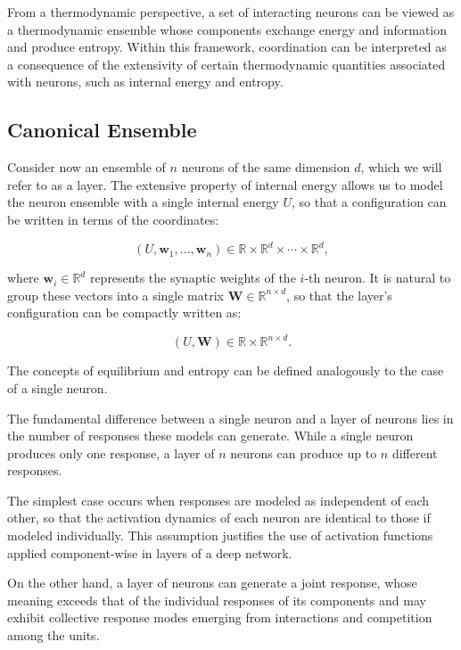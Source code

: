 \documentclass[12pt]{article}
\begin{document}
From a thermodynamic perspective, a set of interacting neurons can be viewed as a thermodynamic ensemble whose components exchange energy and information and produce entropy. Within this framework, coordination can be interpreted as a consequence of the extensivity of certain thermodynamic quantities associated with neurons, such as internal energy and entropy.
\subsection*{Canonical Ensemble}

Consider now an ensemble of $n$ neurons of the same dimension $d$, which we will refer to as a layer. The extensive property of internal energy allows us to model the neuron ensemble with a single internal energy $U$, so that a configuration can be written in terms of the coordinates:

\begin{equation}
(U, \mathbf{w}_1, \ldots, \mathbf{w}_n) \in \mathbb{R} \times \mathbb{R}^{d} \times \cdots \times \mathbb{R}^d  ,
\end{equation}

where $\mathbf{w}_i \in \mathbb{R}^d$ represents the synaptic weights of the $i$-th neuron. It is natural to group these vectors into a single matrix $\mathbf{W} \in \mathbb{R}^{n \times d}$, so that the layer’s configuration can be compactly written as:

\begin{equation}
(U, \mathbf{W}) \in \mathbb{R} \times \mathbb{R}^{n \times d}.
\end{equation}

The concepts of equilibrium and entropy can be defined analogously to the case of a single neuron.

The fundamental difference between a single neuron and a layer of neurons lies in the number of responses these models can generate. While a single neuron produces only one response, a layer of $n$ neurons can produce up to $n$ different responses.

The simplest case occurs when responses are modeled as independent of each other, so that the activation dynamics of each neuron are identical to those if modeled individually. This assumption justifies the use of activation functions applied component-wise in layers of a deep network.

On the other hand, a layer of neurons can generate a joint response, whose meaning exceeds that of the individual responses of its components and may exhibit collective response modes emerging from interactions and competition among the units.
\end{document}
